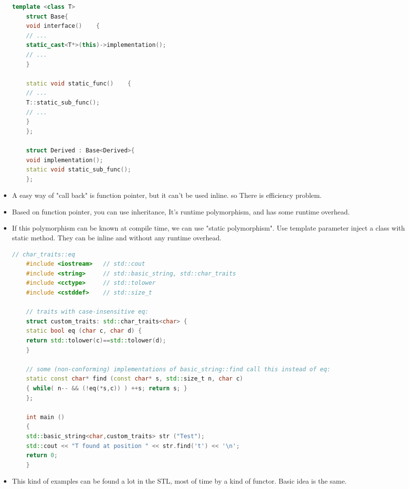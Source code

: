 \documentclass[a4paper,12pt,twoside]{book}
\begin{document}
\begin{itemize}
	\begin{lstlisting}[frame=single, language=c++]
	template <class T> 
	struct Base{
	void interface()    {
	// ...
	static_cast<T*>(this)->implementation();
	// ...
	}
	
	static void static_func()    {
	// ...
	T::static_sub_func();
	// ...
	}
	};
	
	struct Derived : Base<Derived>{
	void implementation();
	static void static_sub_func();
	};
	\end{lstlisting}
	
	\item A easy way of "call back" is function pointer, but it can't be used inline. so There is efficiency problem. 
	
	\item Based on function pointer, you can use inheritance, It's runtime polymorphism, and has some runtime overhead. 
	
	\item If this polymorphism can be known at compile time, we can use "static polymorphism". Use template parameter inject a class with static method. They can be inline and without any runtime overhead. 
	\begin{lstlisting}[frame=single, language=c++]
	// char_traits::eq
	#include <iostream>   // std::cout
	#include <string>     // std::basic_string, std::char_traits
	#include <cctype>     // std::tolower
	#include <cstddef>    // std::size_t
	
	// traits with case-insensitive eq:
	struct custom_traits: std::char_traits<char> {
	static bool eq (char c, char d) { 
	return std::tolower(c)==std::tolower(d); 
	}
	
	// some (non-conforming) implementations of basic_string::find call this instead of eq:
	static const char* find (const char* s, std::size_t n, char c)
	{ while( n-- && (!eq(*s,c)) ) ++s; return s; }
	};
	
	int main ()
	{
	std::basic_string<char,custom_traits> str ("Test");
	std::cout << "T found at position " << str.find('t') << '\n';
	return 0;
	}
	\end{lstlisting}
	
	\item This kind of examples can be found a lot in the STL, most of time by a kind of functor. Basic idea is the same.
	
\end{itemize}
\end{document}
